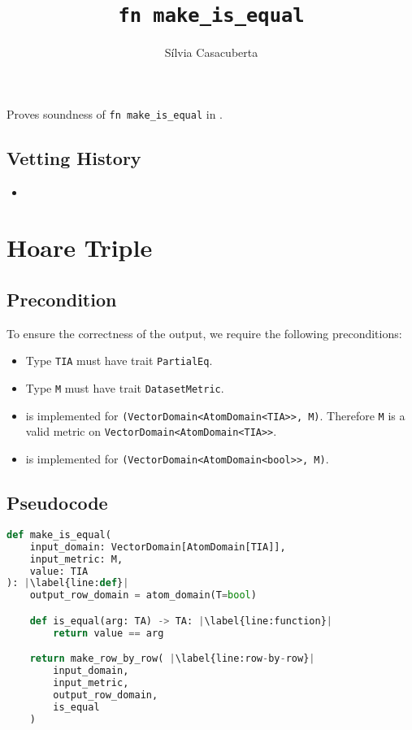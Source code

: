 \documentclass{article}
\title{\texttt{fn make\_is\_equal}}
\author{S\'ilvia Casacuberta}
\date{}
\begin{document}
\maketitle

\contrib
Proves soundness of \texttt{fn make\_is\_equal} in .

\subsection*{Vetting History}
\begin{itemize}
    \item {}
\end{itemize}

\section{Hoare Triple}
\subsection*{Precondition}
To ensure the correctness of the output, we require the following preconditions:

\begin{itemize}
    \item Type \texttt{TIA} must have trait \texttt{PartialEq}.
    \item Type \texttt{M} must have trait \texttt{DatasetMetric}.
    \item {} is implemented for \texttt{(VectorDomain<AtomDomain<TIA>>, M)}. Therefore \texttt{M} is a valid metric on \texttt{VectorDomain<AtomDomain<TIA>>}.
    \item {} is implemented for \texttt{(VectorDomain<AtomDomain<bool>>, M)}.
\end{itemize}

\subsection*{Pseudocode}
\begin{lstlisting}[language=Python, escapechar=|] 
def make_is_equal(
    input_domain: VectorDomain[AtomDomain[TIA]], 
    input_metric: M, 
    value: TIA
): |\label{line:def}|
    output_row_domain = atom_domain(T=bool)

    def is_equal(arg: TA) -> TA: |\label{line:function}|
        return value == arg

    return make_row_by_row( |\label{line:row-by-row}|
        input_domain, 
        input_metric, 
        output_row_domain, 
        is_equal
    )
\end{lstlisting}
\end{document}
